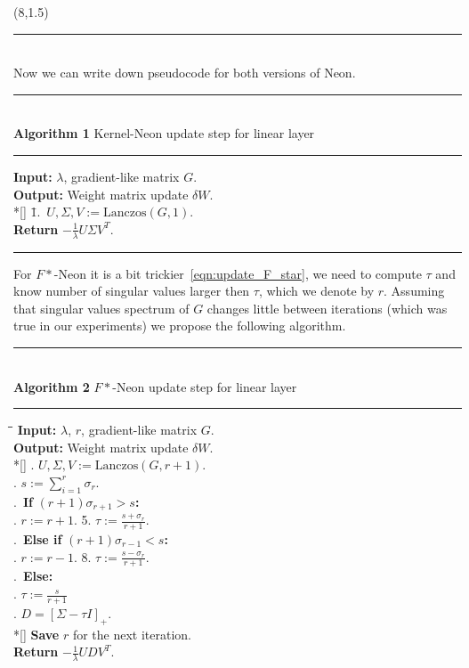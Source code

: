 \documentclass[a0]{a0poster}
\def\Head#1{\noindent{\LARGE\color{bluegray} #1}\bigskip}
\begin{document}
\begin{textblock}{7.0}(8,1.5)
\hrule\medskip
\Head{Algorithms}\\
Now we can write down pseudocode for both versions of Neon.

\noindent\rule[-5pt]{.8\textwidth}{0.4pt}\\
{\bf Algorithm 1} Kernel-Neon update step for linear layer\\
\noindent\rule[10pt]{.8\textwidth}{0.4pt}
\vspace{-10pt}
\noindent\begin{tabbing}
    {\bf Input:} $\lambda$, gradient-like matrix $G$. \\
    {\bf Output:} Weight matrix update $\delta W$.\\*[\smallskipamount]
    \qquad \= 1.\ $U, \Sigma, V := \textrm{Lanczos}(G, 1)$. \\
    {\bf Return} $-\frac{1}{\lambda}U \Sigma V^T$.
\end{tabbing}
\vspace{-8pt}
\noindent\rule[10pt]{.8\textwidth}{0.4pt}

For $F*$-Neon it is a bit trickier~\eqref{eqn:update_F_star}, we need to compute $\tau$ and know number of singular values larger then $\tau$, which we denote by $r$. Assuming that singular values spectrum of $G$ changes little between iterations (which was true in our experiments) we propose the following algorithm.

\noindent\rule[-5pt]{.8\textwidth}{0.4pt}\\
{\bf Algorithm 2} $F*$-Neon update step for linear layer\\
\noindent\rule[10pt]{.8\textwidth}{0.4pt}
\vspace{-10pt}
\noindent\begin{tabbing}
    \qquad\=\qquad\=\qquad\=\kill %
    {\bf Input:} $\lambda$, $r$, gradient-like matrix $G$. \\
    {\bf Output:} Weight matrix update $\delta W$.\\*[\smallskipamount]
    . $U, \Sigma, V := \textrm{Lanczos}(G, r + 1)$. \\
    . $s := \sum_{i=1}^{r}\sigma_r$. \\
    .\ {\bf If} $(r + 1)\sigma_{r + 1} > s${\bf:}\\
    \>. $r := r + 1$. 5. $\tau := \frac{s + \sigma_{r}}{r + 1}$.\\
    .\ {\bf Else if} $(r + 1)\sigma_{r - 1} < s${\bf:}\\
    \>. $r := r - 1$. 8. $\tau := \frac{s - \sigma_{r}}{r + 1}$.\\
    .\ {\bf Else:}\\
    \>. $\tau := \frac{s}{r + 1}$\\
    . $D = [\Sigma - \tau I]_+$. \\*[\smallskipamount]
    {\bf Save} $r$ for the next iteration.\\
    {\bf Return} $-\frac{1}{\lambda}U D V^T$.
\end{tabbing}
\vspace{10pt}


\end{textblock}
\end{document}
